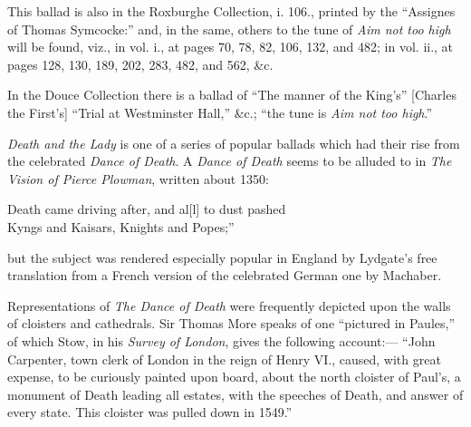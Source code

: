 This ballad is also in the Roxburghe Collection, i. 106., printed by the “Assignes
of Thomas Symcocke:” and, in the same, others to the tune of \textit{Aim not too high}
will be found, viz., in vol. i., at pages 70, 78, 82, 106, 132, and 482; in vol. ii.,
at pages 128, 130, 189, 202, 283, 482, and 562, \&c.

In the Douce Collection there is a ballad of “The manner of the King’s”
[Charles the First’s] “Trial at Westminster Hall,” \&c.; “the tune is \textit{Aim not
too high}.”


\textit{Death and the Lady} is one of a series of popular ballads which had their rise
from the celebrated \textit{Dance of Death}. A \textit{Dance of Death} seems to be alluded to
in \textit{The Vision of Pierce Plowman}, written about 1350:
\begin{scverse}
Death came driving after, and al[l] to dust pashed\\
Kyngs and Kaisars, Knights and Popes;”
\end{scverse}
but the subject was rendered especially popular in England by Lydgate’s free
translation from a French version of the celebrated German one by Machaber.

Representations of \textit{The Dance of Death} were frequently depicted upon the
walls of cloisters and cathedrals. Sir Thomas More speaks of one “pictured in
Paules,” of which Stow, in his \textit{Survey of London}, gives the following account:—
“John Carpenter, town clerk of London in the reign of Henry VI., caused, with
great expense, to be curiously painted upon board, about the north cloister of
Paul’s, a monument of Death leading all estates, with the speeches of Death, and
answer of every state. This cloister was pulled down in 1549.”

